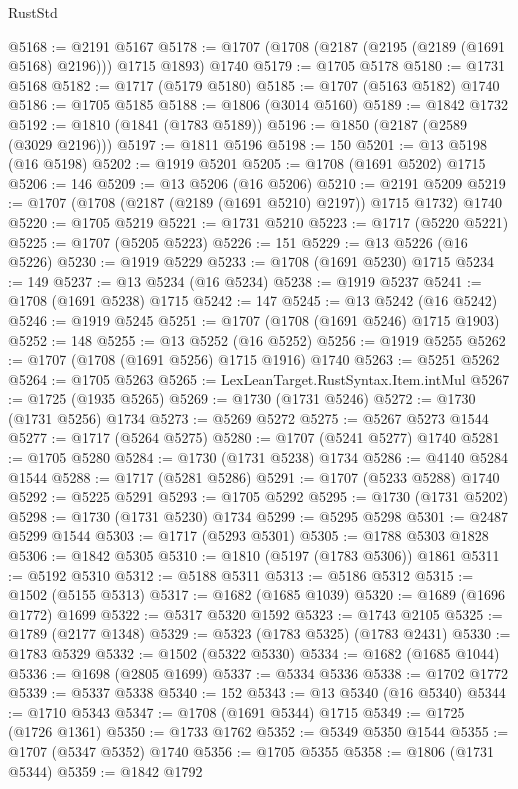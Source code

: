 \begin{lexlean}{RustStd}
\begin{coremodule}
@5168 := @2191 @5167
@5178 := @1707 (@1708 (@2187 (@2195 (@2189 (@1691 @5168) @2196))) @1715 @1893) @1740
@5179 := @1705 @5178
@5180 := @1731 @5168
@5182 := @1717 (@5179 @5180)
@5185 := @1707 (@5163 @5182) @1740
@5186 := @1705 @5185
@5188 := @1806 (@3014 @5160)
@5189 := @1842 @1732
@5192 := @1810 (@1841 (@1783 @5189))
@5196 := @1850 (@2187 (@2589 (@3029 @2196)))
@5197 := @1811 @5196
@5198 := 150
@5201 := @13 @5198 (@16 @5198)
@5202 := @1919 @5201
@5205 := @1708 (@1691 @5202) @1715
@5206 := 146
@5209 := @13 @5206 (@16 @5206)
@5210 := @2191 @5209
@5219 := @1707 (@1708 (@2187 (@2189 (@1691 @5210) @2197)) @1715 @1732) @1740
@5220 := @1705 @5219
@5221 := @1731 @5210
@5223 := @1717 (@5220 @5221)
@5225 := @1707 (@5205 @5223)
@5226 := 151
@5229 := @13 @5226 (@16 @5226)
@5230 := @1919 @5229
@5233 := @1708 (@1691 @5230) @1715
@5234 := 149
@5237 := @13 @5234 (@16 @5234)
@5238 := @1919 @5237
@5241 := @1708 (@1691 @5238) @1715
@5242 := 147
@5245 := @13 @5242 (@16 @5242)
@5246 := @1919 @5245
@5251 := @1707 (@1708 (@1691 @5246) @1715 @1903)
@5252 := 148
@5255 := @13 @5252 (@16 @5252)
@5256 := @1919 @5255
@5262 := @1707 (@1708 (@1691 @5256) @1715 @1916) @1740
@5263 := @5251 @5262
@5264 := @1705 @5263
@5265 := LexLeanTarget.RustSyntax.Item.intMul
@5267 := @1725 (@1935 @5265)
@5269 := @1730 (@1731 @5246)
@5272 := @1730 (@1731 @5256) @1734
@5273 := @5269 @5272
@5275 := @5267 @5273 @1544
@5277 := @1717 (@5264 @5275)
@5280 := @1707 (@5241 @5277) @1740
@5281 := @1705 @5280
@5284 := @1730 (@1731 @5238) @1734
@5286 := @4140 @5284 @1544
@5288 := @1717 (@5281 @5286)
@5291 := @1707 (@5233 @5288) @1740
@5292 := @5225 @5291
@5293 := @1705 @5292
@5295 := @1730 (@1731 @5202)
@5298 := @1730 (@1731 @5230) @1734
@5299 := @5295 @5298
@5301 := @2487 @5299 @1544
@5303 := @1717 (@5293 @5301)
@5305 := @1788 @5303 @1828
@5306 := @1842 @5305
@5310 := @1810 (@5197 (@1783 @5306)) @1861
@5311 := @5192 @5310
@5312 := @5188 @5311
@5313 := @5186 @5312
@5315 := @1502 (@5155 @5313)
@5317 := @1682 (@1685 @1039)
@5320 := @1689 (@1696 @1772) @1699
@5322 := @5317 @5320 @1592
@5323 := @1743 @2105
@5325 := @1789 (@2177 @1348)
@5329 := @5323 (@1783 @5325) (@1783 @2431)
@5330 := @1783 @5329
@5332 := @1502 (@5322 @5330)
@5334 := @1682 (@1685 @1044)
@5336 := @1698 (@2805 @1699)
@5337 := @5334 @5336
@5338 := @1702 @1772
@5339 := @5337 @5338
@5340 := 152
@5343 := @13 @5340 (@16 @5340)
@5344 := @1710 @5343
@5347 := @1708 (@1691 @5344) @1715
@5349 := @1725 (@1726 @1361)
@5350 := @1733 @1762
@5352 := @5349 @5350 @1544
@5355 := @1707 (@5347 @5352) @1740
@5356 := @1705 @5355
@5358 := @1806 (@1731 @5344)
@5359 := @1842 @1792

\end{coremodule}
\end{lexlean}

